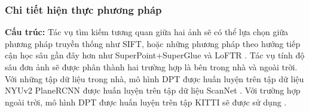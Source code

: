 \subsubsection*{Chi tiết hiện thực phương pháp}

\textbf{Cấu trúc:} Tác vụ tìm kiếm tương quan giữa hai ảnh sẽ có thể lựa chọn giữa phương pháp truyền thống như SIFT, hoặc những phương pháp theo hướng tiếp cận học sâu gần đây hơn như SuperPoint+SuperGlue \cite{sarlin2020superglue} và LoFTR \cite{sun2021loftr}. Tác vụ tính độ sâu đơn ảnh sẽ được phân thành hai trường hợp là bên trong nhà và ngoài trời. Với những tập dữ liệu trong nhà, mô hình DPT \cite{ranftl2021vision} được huấn luyện trên tập dữ liệu NYUv2 \cite{silberman2012indoor} PlaneRCNN \cite{liu2019planercnn} được huấn luyện trên tập dữ liệu ScanNet \cite{dai2017scannet}. Với trường hợp ngoài trời, mô hình DPT \cite{ranftl2021vision} được huấn luyện trên tập KITTI sẽ được sử dụng \cite{geiger2012we}.

